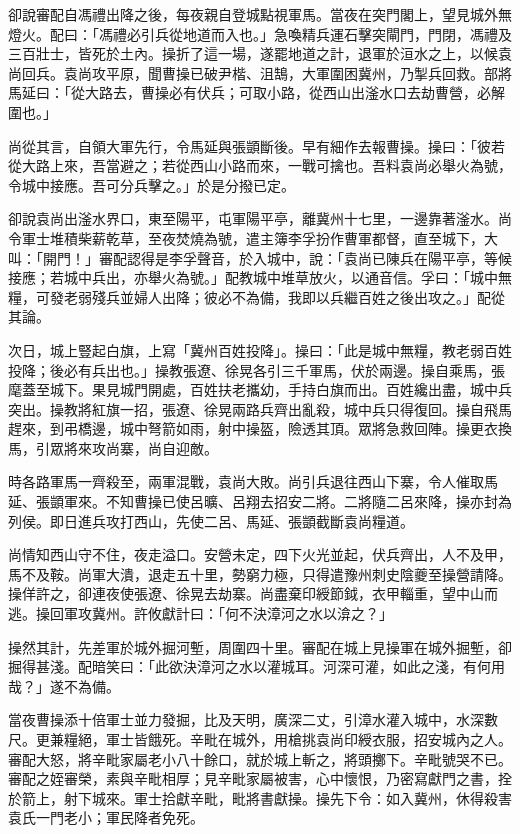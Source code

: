 卻說審配自馮禮出降之後，每夜親自登城點視軍馬。當夜在突門閣上，望見城外無燈火。配曰：「馮禮必引兵從地道而入也。」急喚精兵運石擊突閘門，門閉，馮禮及三百壯士，皆死於土內。操折了這一場，遂罷地道之計，退軍於洹水之上，以候袁尚回兵。袁尚攻平原，聞曹操已破尹楷、沮鵠，大軍圍困冀州，乃掣兵回救。部將馬延曰：「從大路去，曹操必有伏兵；可取小路，從西山出滏水口去劫曹營，必解圍也。」

尚從其言，自領大軍先行，令馬延與張顗斷後。早有細作去報曹操。操曰：「彼若從大路上來，吾當避之；若從西山小路而來，一戰可擒也。吾料袁尚必舉火為號，令城中接應。吾可分兵擊之。」於是分撥已定。

卻說袁尚出滏水界口，東至陽平，屯軍陽平亭，離冀州十七里，一邊靠著滏水。尚令軍士堆積柴薪乾草，至夜焚燒為號，遣主簿李孚扮作曹軍都督，直至城下，大叫：「開門！」審配認得是李孚聲音，於入城中，說：「袁尚已陳兵在陽平亭，等候接應；若城中兵出，亦舉火為號。」配教城中堆草放火，以通音信。孚曰：「城中無糧，可發老弱殘兵並婦人出降；彼必不為備，我即以兵繼百姓之後出攻之。」配從其論。

次日，城上豎起白旗，上寫「冀州百姓投降」。操曰：「此是城中無糧，教老弱百姓投降；後必有兵出也。」操教張遼、徐晃各引三千軍馬，伏於兩邊。操自乘馬，張麾蓋至城下。果見城門開處，百姓扶老攜幼，手持白旗而出。百姓纔出盡，城中兵突出。操教將紅旗一招，張遼、徐晃兩路兵齊出亂殺，城中兵只得復回。操自飛馬趕來，到弔橋邊，城中弩箭如雨，射中操盔，險透其頂。眾將急救回陣。操更衣換馬，引眾將來攻尚寨，尚自迎敵。

時各路軍馬一齊殺至，兩軍混戰，袁尚大敗。尚引兵退往西山下寨，令人催取馬延、張顗軍來。不知曹操已使呂曠、呂翔去招安二將。二將隨二呂來降，操亦封為列侯。即日進兵攻打西山，先使二呂、馬延、張顗截斷袁尚糧道。

尚情知西山守不住，夜走溢口。安營未定，四下火光並起，伏兵齊出，人不及甲，馬不及鞍。尚軍大潰，退走五十里，勢窮力極，只得遣豫州刺史陰夔至操營請降。操佯許之，卻連夜使張遼、徐晃去劫寨。尚盡棄印綬節鉞，衣甲輜重，望中山而逃。操回軍攻冀州。許攸獻計曰：「何不決漳河之水以渰之？」

操然其計，先差軍於城外掘河塹，周圍四十里。審配在城上見操軍在城外掘塹，卻掘得甚淺。配暗笑曰：「此欲決漳河之水以灌城耳。河深可灌，如此之淺，有何用哉？」遂不為備。

當夜曹操添十倍軍士並力發掘，比及天明，廣深二丈，引漳水灌入城中，水深數尺。更兼糧絕，軍士皆餓死。辛毗在城外，用槍挑袁尚印綬衣服，招安城內之人。審配大怒，將辛毗家屬老小八十餘口，就於城上斬之，將頭擲下。辛毗號哭不已。審配之姪審榮，素與辛毗相厚；見辛毗家屬被害，心中懷恨，乃密寫獻門之書，拴於箭上，射下城來。軍士拾獻辛毗，毗將書獻操。操先下令：如入冀州，休得殺害袁氏一門老小；軍民降者免死。

